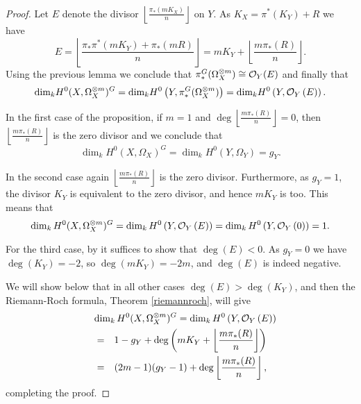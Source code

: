   \begin{proof}

    Let $E$ denote the divisor $\left\lfloor \frac{\pi_*(mK_X)}{n} \right\rfloor$ on $Y$. As $K_X=\pi^*(K_Y)+R$ we have
      \[ E = 
      \left \lfloor \frac{\pi_*\pi^*(mK_Y) + \pi_*(mR)}{n} \right \rfloor =
      mK_Y + \left \lfloor \frac{m\pi_*(R)}{n} \right \rfloor.\]
    Using the previous lemma we conclude that $\pi_*^G(\Omega_X^{\otimes m}) \cong {\cal O}_Y (E)$ and finally that
      \begin{equation*}
	\textrm{dim}_k H^0(X,\Omega_X^{\otimes m})^G 
	 = \textrm{dim}_k H^0\left(Y, \pi_*^G(\Omega_X^{\otimes m})\right)
	  = \textrm{dim}_k H^0\left(Y, {\cal O}_Y\left( E \right) \right).
      \end{equation*}


  In the first case of the proposition, \ie if $m=1$ and $\deg \left\lfloor\frac{m\pi_*(R)}{n} \right\rfloor=0$, then $\left\lfloor\frac{m\pi_*(R)}{n} \right\rfloor$ is the zero divisor and we conclude that 
    \begin{equation*}
	\dim_kH^0(X,\Omega_X)^G = \dim_kH^0(Y, \Omega_Y) = g_Y.
    \end{equation*}


  In the second case again $\left\lfloor \frac{m\pi_*(R)}{n} \right\rfloor$ is the zero divisor. 
  Furthermore, as $g_Y=1$, the divisor $K_Y$ is equivalent to the zero divisor, and hence $mK_Y$ is too. 
  This means that
    \begin{equation*}
      \dim_kH^0(X,\Omega_X^{\otimes m})^G = \dim_kH^0\left( Y,{\cal O}_Y\left( E \right) \right) 
      = \dim_k  H^0\left( Y,{\cal O}_Y\left( 0 \right) \right)
      = 1.
    \end{equation*}


  For the third case, by \cite[Ex. 1.3.4, Ch IV]{hart} it suffices to show that $\deg \left( E \right) < 0$.
  As $g_Y=0$ we have $\deg(K_Y)=-2$, so $\deg(mK_Y)=-2m$, and $\deg \left( E \right)$ is indeed negative.



  We will show below that in all other cases $\deg(E) > \deg(K_Y)$, and then the Riemann-Roch formula, Theorem \ref{riemannroch}, will give 
     \begin{eqnarray*}
	\lefteqn{\dim_kH^0(X,\Omega_X^{\otimes m})^G = \dim_kH^0\left(Y,\cO_Y\left( E \right)\right)} \\
	& = & 1-g_Y+\deg\left(mK_Y+\left\lfloor{\frac{m\pi_*(R)}{n}}\right\rfloor\right) \\
	& = & (2m-1)(g_Y-1)+\deg\left\lfloor{\frac{m\pi_*(R)}{n}}\right\rfloor,
      \end{eqnarray*}
  completing the proof.



\end{proof}
